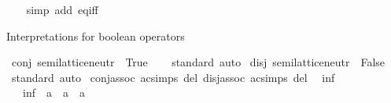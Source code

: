 \begin{isabellebody}
%
\isadelimproof
\ \ %
\endisadelimproof
%
\isatagproof
{}\isamarkupfalse%
\ {\isacharparenleft}{\kern0pt}simp\ add{\isacharcolon}{\kern0pt}\ eq{\isacharunderscore}{\kern0pt}iff{\isacharparenright}{\kern0pt}%
\endisatagproof
{\isafoldproof}%
%
\isadelimproof
\isanewline
%
\endisadelimproof
\isanewline
{}\isamarkupfalse%
%
\begin{isamarkuptext}%
Interpretations for boolean operators%
\end{isamarkuptext}\isamarkuptrue%
\isamarkupfalse%
\ conj{\isacharcolon}{\kern0pt}\ semilattice{\isacharunderscore}{\kern0pt}neutr\ {\isacartoucheopen}{\isacharparenleft}{\kern0pt}{\isasymand}{\isacharparenright}{\kern0pt}{\isacartoucheclose}\ True\isanewline
%
\isadelimproof
\ \ %
\endisadelimproof
%
\isatagproof
{}\isamarkupfalse%
\ standard\ auto%
\endisatagproof
{\isafoldproof}%
%
\isadelimproof
\isanewline
%
\endisadelimproof
\isanewline
{}\isamarkupfalse%
\ disj{\isacharcolon}{\kern0pt}\ semilattice{\isacharunderscore}{\kern0pt}neutr\ {\isacartoucheopen}{\isacharparenleft}{\kern0pt}{\isasymor}{\isacharparenright}{\kern0pt}{\isacartoucheclose}\ False\isanewline
%
\isadelimproof
\ \ %
\endisadelimproof
%
\isatagproof
{}\isamarkupfalse%
\ standard\ auto%
\endisatagproof
{\isafoldproof}%
%
\isadelimproof
\isanewline
%
\endisadelimproof
\isanewline
{}\isamarkupfalse%
\ conj{\isacharunderscore}{\kern0pt}assoc\ {\isacharbrackleft}{\kern0pt}ac{\isacharunderscore}{\kern0pt}simps\ del{\isacharbrackright}{\kern0pt}\ disj{\isacharunderscore}{\kern0pt}assoc\ {\isacharbrackleft}{\kern0pt}ac{\isacharunderscore}{\kern0pt}simps\ del{\isacharbrackright}{\kern0pt}\ %
%
\isadelimdocument
%
\endisadelimdocument
%
\isatagdocument
%
\isamarkuptrue%
%
\endisatagdocument
{\isafolddocument}%
%
\isadelimdocument
%
\endisadelimdocument
{}\isamarkupfalse%
\ inf\ {\isacharequal}{\kern0pt}\isanewline
\ \ \ inf\ {\isacharcolon}{\kern0pt}{\isacharcolon}{\kern0pt}\ {\isachardoublequoteopen}{\isacharprime}{\kern0pt}a\ {\isasymRightarrow}\ {\isacharprime}{\kern0pt}a\ {\isasymRightarrow}\ {\isacharprime}{\kern0pt}a{\isachardoublequoteclose}\ {\isacharparenleft}{\kern0pt}\ {\isachardoublequoteopen}{\isasymsqinter}{\isachardoublequoteclose}\ {}{}{\isacharparenright}{\kern0pt}\isanewline
\isanewline
{}\isamarkupfalse%

\end{isabellebody}
